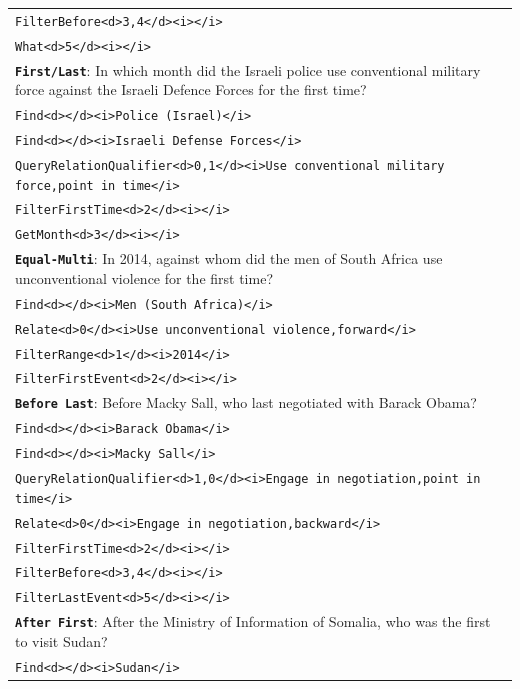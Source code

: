 \documentclass[10pt, a4paper]{article}
\begin{document}
\begin{table}[ht]
{\begin{tabular}{ p{} }
        \texttt{FilterBefore<d>3,4</d><i></i>}\\
        \texttt{What<d>5</d><i></i>}\\
        \midrule
         \textbf{\texttt{First/Last}}: In which month did the Israeli police use conventional military force against the Israeli Defence Forces for the first time? \\
        \midrule
        \texttt{Find<d></d><i>Police (Israel)</i>}\\
        \texttt{Find<d></d><i>Israeli Defense Forces</i>}\\
        \texttt{QueryRelationQualifier<d>0,1</d><i>Use conventional military force,point in time</i>}\\
        \texttt{FilterFirstTime<d>2</d><i></i>}\\
        \texttt{GetMonth<d>3</d><i></i>}\\
        \midrule
         \textbf{\texttt{Equal-Multi}}: In 2014, against whom did the men of South Africa use unconventional violence for the first time? \\
        \midrule
        \texttt{Find<d></d><i>Men (South Africa)</i>}\\
        \texttt{Relate<d>0</d><i>Use unconventional violence,forward</i>}\\
        \texttt{FilterRange<d>1</d><i>2014</i>}\\
        \texttt{FilterFirstEvent<d>2</d><i></i>}\\
        \midrule
         \textbf{\texttt{Before Last}}: Before Macky Sall, who last negotiated with Barack Obama? \\
        \midrule
        \texttt{Find<d></d><i>Barack Obama</i>}\\
        \texttt{Find<d></d><i>Macky Sall</i>}\\
        \texttt{QueryRelationQualifier<d>1,0</d><i>Engage in negotiation,point in time</i>}\\
        \texttt{Relate<d>0</d><i>Engage in negotiation,backward</i>}\\
        \texttt{FilterFirstTime<d>2</d><i></i>}\\
        \texttt{FilterBefore<d>3,4</d><i></i>}\\
        \texttt{FilterLastEvent<d>5</d><i></i>}\\
        \midrule
         \textbf{\texttt{After First}}: After the Ministry of Information of Somalia, who was the first to visit Sudan? \\
        \midrule
        \texttt{Find<d></d><i>Sudan</i>}\\

\end{tabular}}
\end{table}
\end{document}
